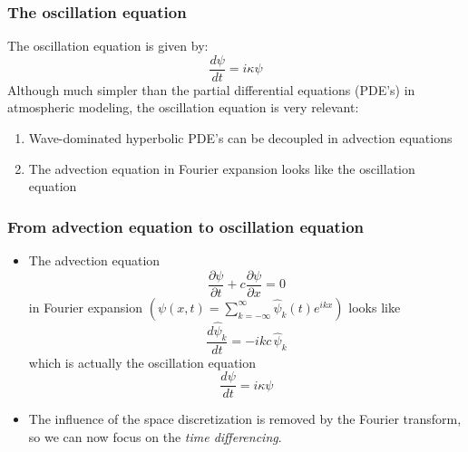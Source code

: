 \documentclass[aspectratio=43,9pt]{beamer}
\begin{document}
%
%
\begin{frame}
	\frametitle{The oscillation equation}
	The oscillation equation is given by:
	\begin{equation*}
		\frac{d \psi}{d t} = i \kappa \psi
	\end{equation*}
	Although much simpler than the partial differential equations (PDE's) in atmospheric modeling, the oscillation equation is very relevant:\vspace*{2ex}
	\begin{enumerate}
		\item Wave-dominated hyperbolic PDE's can be decoupled in advection equations\vspace*{2ex}
		\item The advection equation in Fourier expansion looks like the oscillation equation
	\end{enumerate}
\end{frame}
%
%
%
\begin{frame}
	\frametitle{From advection equation to oscillation equation}
	\begin{itemize}
		\item The advection equation
			\begin{equation*}
				\frac{\partial \psi}{\partial t} + c \frac{\partial \psi}{\partial x} = 0
			\end{equation*}
			in Fourier expansion $\left(\psi(x,t)=\sum_{k=-\infty}^{\infty} \hat\psi_k(t)e^{ikx}\right)$ looks like
			\begin{equation*}
				\frac{d \hat\psi_k}{d t} = - i k c \, \hat\psi_k
			\end{equation*}
			which is actually the oscillation equation
			\begin{equation*}
				\frac{d \psi}{d t} = i \kappa \psi
			\end{equation*}
		\item The influence of the space discretization is removed by the Fourier transform, so we can now focus on the \emph{time differencing}.
	\end{itemize}
%
\end{frame}
%
%
%
\end{document}
